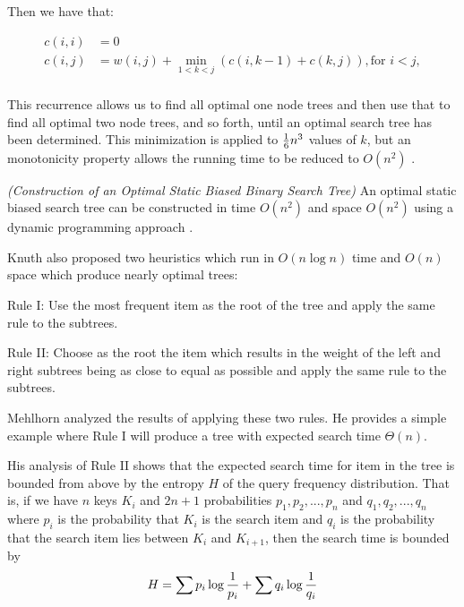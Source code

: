 \documentclass[mcs]{scsthesis}
\begin{document}
Then we have that:

\begin{equation}
    \begin{aligned}
    c(i, i) & = 0 \\
    c(i, j) & = w(i, j) + \min_{1<k<j} (c(i, k - 1) + c(k, j)), \text{for } i<j, \\
    \end{aligned}
\end{equation}

This recurrence allows us to find all optimal one node trees and then use that
to find all optimal two node trees, and so forth, until an optimal search
tree has been determined. This minimization is applied to \({1\over{6}} n^{3} \)
values of \( k \), but an monotonicity property allows the running time
to be reduced to \( O(n^2) \) \cite{knuth}.

\begin{thm} \emph{(Construction of an Optimal Static Biased Binary Search Tree)} 
An optimal static biased search tree can be constructed in time \(O(n^2)\) and
space \(O(n^2)\) using a dynamic programming approach \cite{knuth}.
\end{thm}

Knuth also proposed two heuristics which run in \(O(n \log n)\) time and
\(O(n)\) space which produce nearly optimal trees:

Rule I: Use the most frequent item as the root of the tree and apply the same
rule to the subtrees.

Rule II: Choose as the root the item which results in the weight of the left
and right subtrees being as close to equal as possible and apply the same
rule to the subtrees. 

Mehlhorn \cite{mehlhorn} analyzed the results of applying these two rules. He
provides a simple example where Rule I will produce a tree with expected
search time \(\Theta(n)\).

His analysis of Rule II shows that the expected search time for item in the tree
is bounded from above by the entropy \(H\) of the query frequency distribution.
That is, if we have $n$ keys \(K_i\) and \(2n + 1\) probabilities
\(p_1, p_2, ..., p_n\) and \(q_1, q_2, ..., q_n\) where \(p_i\) is the
probability that \(K_i\) is the search item and \(q_i\) is the
probability that the search item lies between \(K_i\) and \(K_{i+1}\), then
the search time is bounded by
$$
H = \sum{ p_i \log{1 \over p_i}} + \sum{ q_i \log{1 \over q_i}}
$$

\end{document}
